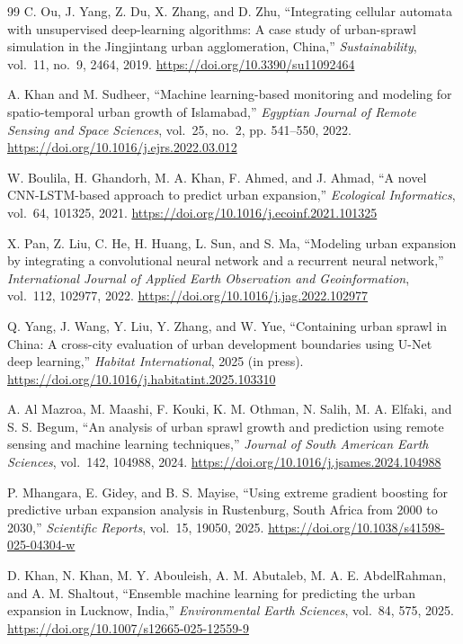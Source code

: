 \documentclass[conference]{IEEEtran}
\begin{document}
\begin{thebibliography}{99}
C. Ou, J. Yang, Z. Du, X. Zhang, and D. Zhu, ``Integrating cellular automata with unsupervised deep-learning algorithms: A case study of urban-sprawl simulation in the Jingjintang urban agglomeration, China,'' \textit{Sustainability}, vol.~11, no.~9, 2464, 2019.
\url{https://doi.org/10.3390/su11092464}

A. Khan and M. Sudheer, ``Machine learning-based monitoring and modeling for spatio-temporal urban growth of Islamabad,'' \textit{Egyptian Journal of Remote Sensing and Space Sciences}, vol.~25, no.~2, pp. 541--550, 2022.
\url{https://doi.org/10.1016/j.ejrs.2022.03.012}

W. Boulila, H. Ghandorh, M. A. Khan, F. Ahmed, and J. Ahmad, ``A novel CNN-LSTM-based approach to predict urban expansion,'' \textit{Ecological Informatics}, vol.~64, 101325, 2021.
\url{https://doi.org/10.1016/j.ecoinf.2021.101325}

X. Pan, Z. Liu, C. He, H. Huang, L. Sun, and S. Ma, ``Modeling urban expansion by integrating a convolutional neural network and a recurrent neural network,'' \textit{International Journal of Applied Earth Observation and Geoinformation}, vol.~112, 102977, 2022.
\url{https://doi.org/10.1016/j.jag.2022.102977}

Q. Yang, J. Wang, Y. Liu, Y. Zhang, and W. Yue, ``Containing urban sprawl in China: A cross-city evaluation of urban development boundaries using U-Net deep learning,'' \textit{Habitat International}, 2025 (in press).
\url{https://doi.org/10.1016/j.habitatint.2025.103310}

A. Al Mazroa, M. Maashi, F. Kouki, K. M. Othman, N. Salih, M. A. Elfaki, and S. S. Begum, ``An analysis of urban sprawl growth and prediction using remote sensing and machine learning techniques,'' \textit{Journal of South American Earth Sciences}, vol.~142, 104988, 2024.
\url{https://doi.org/10.1016/j.jsames.2024.104988}

P. Mhangara, E. Gidey, and B. S. Mayise, ``Using extreme gradient boosting for predictive urban expansion analysis in Rustenburg, South Africa from 2000 to 2030,'' \textit{Scientific Reports}, vol.~15, 19050, 2025.
\url{https://doi.org/10.1038/s41598-025-04304-w}

D. Khan, N. Khan, M. Y. Abouleish, A. M. Abutaleb, M. A. E. AbdelRahman, and A. M. Shaltout, ``Ensemble machine learning for predicting the urban expansion in Lucknow, India,'' \textit{Environmental Earth Sciences}, vol.~84, 575, 2025.
\url{https://doi.org/10.1007/s12665-025-12559-9}

\end{thebibliography}
\end{document}
